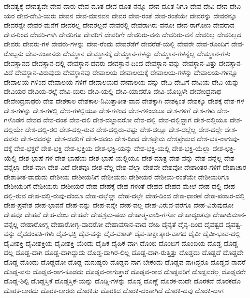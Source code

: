 {ದೇವತ್ವಕ್ಕೆ
ದೇವತ್ವವೇ
ದೇವ-ದಾರು
ದೇವ-ದೂತ
ದೇವ-ದೂತ-ನನ್ನೂ
ದೇವ-ದೂತ-ನಿಗೂ
ದೇವ-ದೇವಿ
ದೇವ-ದೇವಿ-ಯರ
ದೇವ-ದೇವಿ-ಯರು
ದೇವನ
ದೇವ-ಮಾನವನ
ದೇವರ
ದೇವ-ರಂತೆ
ದೇವ-ರಂತೆಯೇ
ದೇವರನ್ನು
ದೇವರನ್ನೂ
ದೇವರನ್ನೇ
ದೇವರ-ಮನೆಗೆ
ದೇವರಲ್ಲ
ದೇವರಲ್ಲದೆ
ದೇವರಲ್ಲಿ
ದೇವರಾಗಿರು-ವನೋ
ದೇವ-ರಾಗೋಣ
ದೇವರಾದ
ದೇವ-ರಿಂದ
ದೇವರಿ-ಗಾಗಿ
ದೇವರಿಗೂ
ದೇವರಿಗೆ
ದೇವರಿಗೇ
ದೇವರಿರು-ವನು
ದೇವರಿರು-ವನೆ
ದೇವರಿಲ್ಲ
ದೇವರಿಲ್ಲದ
ದೇವರು
ದೇವರು-ಗಳ
ದೇವರು-ಗಳನ್ನು
ದೇವ-ರೆಂದು
ದೇವರೆಡೆಗೆ
ದೇವರೆಡೆ-ಯಲ್ಲಿ
ದೇವರೇ
ದೇವ-ರೊಂದಿಗೆ
ದೇವ-ರೊಬ್ಬನು
ದೇವ-ಸಂತಾನರು
ದೇವಸ್ಥಾನ
ದೇವಸ್ಥಾನಕ್ಕೆ
ದೇವಸ್ಥಾನ-ಗಳನ್ನು
ದೇವಸ್ಥಾನ-ಗಳನ್ನೆಲ್ಲ
ದೇವಸ್ಥಾನ-ಗಳು
ದೇವಸ್ಥಾನದ
ದೇವಸ್ಥಾನ-ದಲ್ಲಿ
ದೇವಸ್ಥಾನ-ದವರು
ದೇವಸ್ಥಾನ-ದಿಂದ
ದೇವಸ್ಥಾನ-ವನ್ನು
ದೇವಸ್ಥಾನ-ವಿತ್ತು
ದೇವಸ್ಥಾನ-ವಿದೆ
ದೇವಸ್ಥಾನ-ವಿರುವುದು
ದೇವಸ್ಥಾನವು
ದೇವಾಲಯ
ದೇವಾಲಯಕ್ಕೆ
ದೇವಾಲಯ-ಗಳನ್ನು
ದೇವಾಲಯ-ಗಳನ್ನೂ
ದೇವಾಲಯ-ಗಳಿಂದ
ದೇವಾಲಯ-ಗಳಿಗೆ
ದೇವಾಲಯದ
ದೇವಾಲಯ-ವನ್ನು
ದೇವಿ
ದೇವಿಗೆ
ದೇವಿಯ
ದೇವಿ-ಯನ್ನು
ದೇವಿಯರ
ದೇವಿಯ-ರಲ್ಲೆ
ದೇವಿ-ಯರು
ದೇವಿ-ಯಲ್ಲಿ
ದೇವಿ-ಯಾದರೊ
ದೇವಿ-ಯೊಬ್ಬಳೇ
ದೇವೇಂದ್ರನಾಥ
ದೇವೇಂದ್ರನಾಥರು
ದೇಶ
ದೇಶಕಾಲ
ದೇಶಕಾಲ-ನಿಮಿತ್ತಾತೀತ-ವಾದ
ದೇಶಕ್ಕಾಗಿ
ದೇಶಕ್ಕಿಂತ
ದೇಶಕ್ಕೂ
ದೇಶಕ್ಕೆ
ದೇಶ-ಗಳ
ದೇಶ-ಗಳನ್ನು
ದೇಶ-ಗಳಲ್ಲಿ
ದೇಶ-ಗಳಲ್ಲಿಯೂ
ದೇಶ-ಗಳಿಂದ
ದೇಶ-ಗಳಿಂದಲೂ
ದೇಶ-ಗಳಿಗೆ
ದೇಶ-ಗಳು
ದೇಶ-ಗಳೊಡನೆ
ದೇಶದ
ದೇಶ-ದಂತೆ
ದೇಶ-ದಲಿ
ದೇಶ-ದಲ್ಲಾದರೋ
ದೇಶ-ದಲ್ಲಿ
ದೇಶ-ದಲ್ಲಿದ್ದಾಗ
ದೇಶ-ದಲ್ಲಿಯೂ
ದೇಶ-ದಲ್ಲಿಯೇ
ದೇಶ-ದಲ್ಲಿ-ರಲಿ
ದೇಶ-ದಲ್ಲಿ-ರುವ
ದೇಶ-ದಲ್ಲಿರು-ವಷ್ಟು
ದೇಶ-ದಲ್ಲೂ
ದೇಶ-ದಲ್ಲೆಲ್ಲ
ದೇಶ-ದಲ್ಲೇ
ದೇಶ-ದವನು
ದೇಶ-ದವರನ್ನು
ದೇಶ-ದವರಿಗೆ
ದೇಶ-ದವರು
ದೇಶ-ದಿಂದ
ದೇಶಪ್ರೇಮ
ದೇಶಪ್ರೇಮದ
ದೇಶ-ಭಕ್ತ-ರಾಗುವು-ದಕ್ಕೆ
ದೇಶ-ಭಕ್ತರೆ
ದೇಶ-ಭಕ್ತಿ
ದೇಶ-ಭಕ್ತಿಯ
ದೇಶ-ಭಕ್ತಿ-ಯನ್ನು
ದೇಶ-ಭಕ್ತಿ-ಯಲ್ಲಿ
ದೇಶ-ಭಕ್ತಿ-ಯೆಲ್ಲಾ
ದೇಶ-ಭಕ್ತಿ-ಯೆಲ್ಲಿ
ದೇಶ-ಭಾಷೆ-ಗಳ
ದೇಶ-ಭಾಷೆಯ
ದೇಶ-ಭಾಷೆ-ಯಲ್ಲಿಯೂ
ದೇಶ-ಮಾತ್ರ
ದೇಶ-ವನ್ನು
ದೇಶ-ವನ್ನೆಲ್ಲ
ದೇಶ-ವನ್ನೆಲ್ಲಾ
ದೇಶ-ವಾಗಿ
ದೇಶ-ವಿದೆ
ದೇಶವೂ
ದೇಶ-ವೆಲ್ಲ
ದೇಶ-ವೆಲ್ಲಾ
ದೇಶವೇ
ದೇಶವೋ
ದೇಶಾಂತರ-ಗಳಿಗೆ
ದೇಶಾಚಾರ
ದೇಶಾತೀತ-ವಾದುದು
ದೇಶೀಯ
ದೇಶೀಯನಿಗೆ
ದೇಶೀಯನು
ದೇಶೀಯರ
ದೇಶೀಯ-ರಂತೆಯೇ
ದೇಶೀಯರಿಗೂ
ದೇಶೀಯರಿಗೆ
ದೇಶೀಯರು
ದೇಶೀಯರೆ
ದೇಹ
ದೇಹಕ್ಕೆ
ದೇಹ-ಗಳಂತೆ
ದೇಹದ
ದೇಹದ-ಮೇಲೆ
ದೇಹ-ದಲ್ಲಿ
ದೇಹ-ದಲ್ಲಿ-ರುವ
ದೇಹ-ದಲ್ಲಿ-ರುವು-ದೆಂದೂ
ದೇಹ-ದಲ್ಲೆಲ್ಲಾ
ದೇಹ-ದಲ್ಲೇ
ದೇಹ-ದಿಂದ
ದೇಹ-ಧಾರಣೆ
ದೇಹ-ಪಂಜರ-ದಲ್ಲಿ
ದೇಹ-ಪ್ರವೇಶ
ದೇಹ-ಭಾವನೆ
ದೇಹ-ವನ್ನು
ದೇಹ-ವನ್ನೇ
ದೇಹ-ವಲ್ಲ
ದೇಹ-ವಿರುವ-ವರೆಗೂ
ದೇಹ-ವಿರುವುದೋ
ದೇಹವೂ
ದೇಹವೆ
ದೇಹ-ವೆಂಬ
ದೇಹವೇ
ದೇಹಶ್ರಮ-ಪಡು
ದೇಹಾತ್ಮ-ವಾದಿ-ಗಳೋ
ದೇಹಾದ್ಯಂತವೂ
ದೇಹಾಭಿಮಾನ-ವನ್ನೆಲ್ಲ
ದೇಹಾರೋಗ್ಯ
ದೇಹಾರೋಗ್ಯ-ವಾದರೋ
ದೇಹಾವಸಾನ-ವಾದ
ದೇಹಿ
ದೈನ್ಯತೆ
ದೈನ್ಯ-ದಿಂದ
ದೈವತ್ವದ
ದೈವತ್ವ-ವನ್ನು
ದೈವದಂಪತಿ-ಗಳು
ದೈವ-ಭಕ್ತಿ
ದೈವ-ವನ್ನು
ದೈವ-ವಶಾತ್
ದೈವ-ಸಾಕ್ಷಾತ್ಕಾರ-ವಾಗದ
ದೈವೀ
ದೈವೀ-ಭಾವ-ದಲ್ಲಿ
ದೈವೀಶಕ್ತಿ
ದೈವೀಶಕ್ತಿಯ
ದೈವೀಶಕ್ತಿ-ಯೆಂದು
ದೈಹಿಕ
ದೈಹಿಕ-ವಾಗಿ
ದೊಂಬಿ
ದೊಂಬಿಗೆ
ದೊಂಬಿಯ
ದೊಡ್ಡ
ದೊಡ್ಡ-ದಲ್ಲ
ದೊಡ್ಡ-ದಾಗಿ
ದೊಡ್ಡ-ದಾಗಿದ್ದುದು
ದೊಡ್ಡ-ದಾಗಿರ-ಲಿಲ್ಲ
ದೊಡ್ಡ-ದಾಗಿ-ರುತ್ತಿತ್ತು
ದೊಡ್ಡದು
ದೊಡ್ಡದೆ
ದೊಡ್ಡದೇ
ದೊಡ್ಡ-ದೊಂದು
ದೊಡ್ಡದೋ
ದೊಡ್ಡ-ಮನುಷ್ಯರು
ದೊಡ್ಡವ-ನಾಗ-ಬೇಕೆಂದು
ದೊಡ್ಡವ-ನಾಗಿದ್ದರೂ
ದೊಡ್ಡವ-ನಾದರೆ
ದೊಡ್ಡ-ವನು
ದೊಡ್ಡವ-ರಾಗ-ಕೂಡದು
ದೊಡ್ಡವ-ರಾಗುತ್ತಾರೆ
ದೊಡ್ಡವ-ರಾದ
ದೊಡ್ಡವರಿಗೆ
ದೊಡ್ಡವರೆಲ್ಲ
ದೊಡ್ಡವರೇ
ದೊಡ್ಡ-ಶಿಲ್ಪಿ
ದೊಡ್ಡಸ್ತಿಕೆ
ದೊಡ್ಡಸ್ತಿಕೆ-ಯನ್ನು
ದೊಡ್ಡಿ-ಗಳನ್ನು
ದೊಡ್ದ
ದೊಣ್ಣೆ
ದೊರಕ-ದುದೇ
ದೊರಕದೆ
ದೊರಕದೊ
ದೊರಕ-ಲಾರದು
ದೊರಕ-ಲಾರರು
ದೊರಕಿತು
ದೊರಕಿದ
ದೊರಕಿ-ದಂತಾಗಿದೆ
ದೊರಕಿ-ದವು
ದೊರಕಿ-ದಾಗ
}
